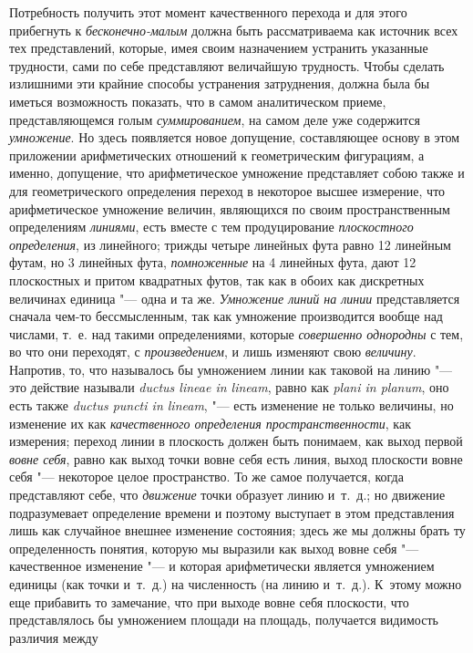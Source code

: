 Потребность получить этот момент качественного перехода и для этого прибегнуть
к {\em бесконечно-малым} должна быть рассматриваема как источник всех тех
представлений, которые, имея своим назначением устранить указанные трудности,
сами по себе представляют величайшую трудность. Чтобы сделать излишними эти
крайние способы устранения затруднения, должна была бы иметься возможность
показать, что в самом аналитическом приеме, представляющемся голым
{\em суммированием}, на самом деле уже содержится {\em умножение}. Но здесь
появляется новое допущение, составляющее основу в этом приложении
арифметических отношений к геометрическим фигурациям, а именно, допущение, что
арифметическое умножение представляет собою также и для геометрического
определения переход в некоторое высшее измерение, что арифметическое умножение
величин, являющихся по своим пространственным определениям {\em линиями}, есть
вместе с тем продуцирование {\em плоскостного определения}, из линейного;
трижды четыре линейных фута равно 12 линейным футам, но 3 линейных фута,
{\em помноженные} на 4 линейных фута, дают 12 плоскостных и притом квадратных
футов, так как в обоих как дискретных величинах единица "--- одна и та же.
{\em Умножение линий на линии} представляется сначала чем-то бессмысленным, так
как умножение производится вообще над числами, т.~е. над такими определениями,
которые {\em совершенно однородны} с тем, во что они переходят, с
{\em произведением}, и лишь изменяют свою {\em величину}. Напротив, то, что
называлось бы умножением линии как таковой на линию "--- это действие называли
{\em ductus lineae in lineam}, равно как {\em plani in planum}, оно есть также
{\em ductus puncti in lineam}, "--- есть изменение не только величины, но
изменение их как {\em качественного определения пространственности}, как
измерения; переход линии в плоскость должен быть понимаем, как выход первой
{\em вовне себя}, равно как выход точки вовне себя есть линия, выход плоскости
вовне себя "--- некоторое целое пространство. То же самое получается, когда
представляют себе, что {\em движение} точки образует линию и~т.~д.; но движение
подразумевает определение времени и поэтому выступает в этом представления лишь
как случайное внешнее изменение состояния; здесь же мы должны брать ту
определенность понятия, которую мы выразили как выход вовне себя "---
качественное изменение "--- и которая арифметически является умножением единицы
(как точки и~т.~д.) на численность (на линию и~т.~д.). К~этому можно еще
прибавить то замечание, что при выходе вовне себя плоскости, что представлялось
бы умножением площади на площадь, получается видимость различия между

